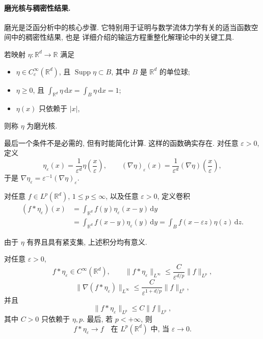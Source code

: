 \paragraph{磨光核与稠密性结果.}
\label{subsec:chap2-mollifiers-density}

磨光是泛函分析中的核心步骤. 它特别用于证明与数学流体力学有关的适当函数空间中的稠密性结果, 也是 详细介绍的输运方程重整化解理论中的关键工具.

\begin{Definition}
\label{def:chap2-mollifying-kernel}
若映射 $\eta:\mathbb{R}^d\to\mathbb{R}$ 满足
\begin{itemize}
\item $\eta\in C_c^\infty(\mathbb{R}^d)$, 且 $\operatorname{Supp}\eta\subset B$, 其中 $B$ 是 $\mathbb{R}^d$ 的单位球;
\item $\eta\geq0$, 且 $\int_{\mathbb{R}^d}\eta\,\mathrm{d}x=\int_B\eta\,\mathrm{d}x=1$;
\item $\eta(x)$ 只依赖于 $|x|$,
\end{itemize}
则称 $\eta$ 为磨光核.
\end{Definition}

最后一个条件不是必需的, 但有时能简化计算. 这样的函数确实存在. 对任意 $\varepsilon>0$, 定义
\[
  \eta_\varepsilon(x)=\frac1{\varepsilon^d}\eta\left(\frac{x}{\varepsilon}\right),
  \qquad
  (\nabla\eta)_\varepsilon(x)=\frac1{\varepsilon^d}(\nabla\eta)\left(\frac{x}{\varepsilon}\right),
\]
于是 $\nabla\eta_\varepsilon=\varepsilon^{-1}(\nabla\eta)_\varepsilon$.

\begin{Definition}
\label{def:chap2-mollified-convolution}
对任意 $f\in L^p(\mathbb{R}^d)$, $1\leq p\leq\infty$, 以及任意 $\varepsilon>0$, 定义卷积
\begin{equation}
\label{eq:chap2-mollified-convolution}
\begin{aligned}
(f*\eta_\varepsilon)(x)
&=\int_{\mathbb{R}^d}f(y)\eta_\varepsilon(x-y)\,\mathrm{d}y\\
&=\int_{\mathbb{R}^d}f(x-y)\eta_\varepsilon(y)\,\mathrm{d}y
=\int_B f(x-\varepsilon z)\eta(z)\,\mathrm{d}z.
\end{aligned}
\end{equation}
\end{Definition}

由于 $\eta$ 有界且具有紧支集, 上述积分均有意义.

\begin{Proposition}
\label{prop:chap2-mollifier-properties}
对任意 $\varepsilon>0$,
\[
  f*\eta_\varepsilon\in C^\infty(\mathbb{R}^d),
  \qquad
  \|f*\eta_\varepsilon\|_{L^\infty}\leq\frac{C}{\varepsilon^{d/p}}\|f\|_{L^p},
\]
\[
  \|\nabla(f*\eta_\varepsilon)\|_{L^\infty}
  \leq\frac{C}{\varepsilon^{1+d/p}}\|f\|_{L^p},
\]
并且
\begin{equation}
\label{eq:chap2-mollifier-lp-bound}
  \|f*\eta_\varepsilon\|_{L^p}\leq C\|f\|_{L^p},
\end{equation}
其中 $C>0$ 只依赖于 $\eta,p$. 最后, 若 $p<+\infty$, 则
\[
  f*\eta_\varepsilon\longrightarrow f
  \quad\text{在 $L^p(\mathbb{R}^d)$ 中, 当 $\varepsilon\to0$}.
\]
\end{Proposition}

